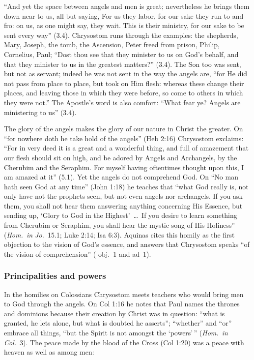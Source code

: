 \noindent ``And yet the space between angels and men is great; nevertheless he
brings them down near to us, all but saying, For us they labor, for our
sake they run to and fro: on us, as one might say, they wait. This is
their ministry, for our sake to be sent every way'' (3.4). Chrysostom
runs through the examples: the shepherds, Mary, Joseph, the tomb, the
Ascension, Peter freed from prison, Philip, Cornelius, Paul; ``Dost thou
see that they minister to us on God's behalf, and that they minister to us
in the greatest matters?'' (3.4). The Son too was sent, but not as
servant; indeed he was not sent in the way the angels are, ``for He did
not pass from place to place, but took on Him flesh: whereas these change
their places, and leaving those in which they were before, so come to
others in which they were not.'' The Apostle's word is also comfort:
``What fear ye? Angels are ministering to us'' (3.4).

The glory of the angels makes the glory of our nature in Christ the
greater. On ``for nowhere doth he take hold of the angels'' (Heb 2:16)
Chrysostom exclaims: ``For in very deed it is a great and a wonderful
thing, and full of amazement that our flesh should sit on high, and be
adored by Angels and Archangels, by the Cherubim and the Seraphim. For
myself having oftentimes thought upon this, I am amazed at it'' (5.1).
Yet the angels do not comprehend God. On ``No man hath seen God at any
time'' (John 1:18) he teaches that ``what God really is, not only have not
the prophets seen, but not even angels nor archangels. If you ask them,
you shall not hear them answering anything concerning His Essence, but
sending up, `Glory to God in the Highest'~\dots\ If you desire to learn
something from Cherubim or Seraphim, you shall hear the mystic song of
His Holiness'' (\emph{Hom.\ in Jo.}\ 15.1; Luke 2:14; Isa 6:3). Aquinas
cites this homily as the first objection to the vision of God's essence,
and answers that Chrysostom speaks ``of the vision of comprehension''
( obj.~1 and ad~1).

\subsubsection{Principalities and powers}

In the homilies on Colossians Chrysostom meets teachers who would bring
men to God through the angels. On Col 1:16 he notes that Paul names the
thrones and dominions because their creation by Christ was in question:
``what is granted, he lets alone, but what is doubted he asserts'';
``whether'' and ``or'' embrace all things, ``but the Spirit is not amongst
the `powers'\,'' (\emph{Hom.\ in Col.}\ 3). The peace made by the blood of
the Cross (Col 1:20) was a peace with heaven as well as among men:

